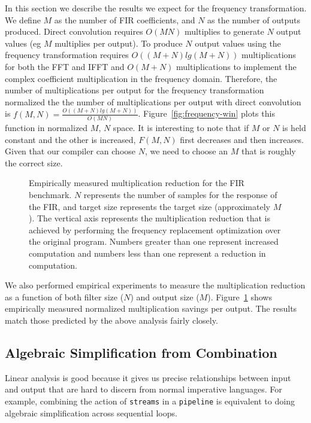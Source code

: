 In this section we describe the results we expect for the frequency transformation. We
define $M$ as the number of FIR coefficients, and $N$ as the number of outputs produced. Direct 
convolution requires $O(MN)$ multiplies to generate $N$ output values 
(eg $M$ multiplies per output). To produce $N$ output values using the frequency transformation 
requires $O((M+N)lg(M+N))$ multiplications for both the FFT and IFFT and $O(M+N)$ 
multiplications to implement the complex coefficient multiplication in the frequency domain.
Therefore, the number of multiplications per output for the frequency transformation
normalized the the number of multiplications per output with direct convolution is
$f(M,N)=\frac{O((M+N)lg(M+N))}{O(MN)}$. Figure~\ref{fig:frequency-win} plots this function
in normalized $M$, $N$ space. It is interesting to note that if $M$ or $N$ is held constant 
and the other is increased, $F(M,N)$ first decreases and then increases. Given that our compiler
can choose $N$, we need to choose an $M$ that is roughly the correct size.

\begin{figure}
\center
\epsfxsize=3.0in
\caption{Empirically measured multiplication reduction for the FIR benchmark. $N$ represents the number of samples for the response of the FIR, and target size represents the target size (approximately $M$). The vertical axis represents the multiplication reduction that is achieved by performing the frequency replacement optimization over the original program. Numbers greater than one represent increased computation and numbers less than one represent a reduction in computation. }
\label{fig:frequency-win-empirical}
\end{figure}


We also performed empirical experiments to measure the multiplication reduction
as a function of both filter size ($N$) and output size ($M$). 
Figure~\ref{fig:frequency-win-empirical} shows empirically measured normalized 
multiplication savings per output. The results match those predicted by the 
above analysis fairly closely.



\subsection{Algebraic Simplification from Combination}
Linear analysis is good because it gives us precise relationships between input and output   
that are hard to discern from normal imperative languages. For example, combining the action
of {\tt streams} in a {\tt pipeline} is equivalent to doing algebraic simplification across
sequential loops. 


